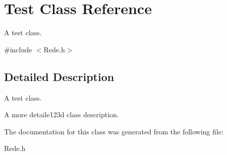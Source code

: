 \hypertarget{class_test}{\section{Test Class Reference}
\label{class_test}
}


A test class.  




{\ttfamily \#include $<$Rede.\+h$>$}



\subsection{Detailed Description}
A test class. 

A more detaile123d class description. 

The documentation for this class was generated from the following file\+:\begin{DoxyCompactItemize}
\item 
Rede.\+h\end{DoxyCompactItemize}
